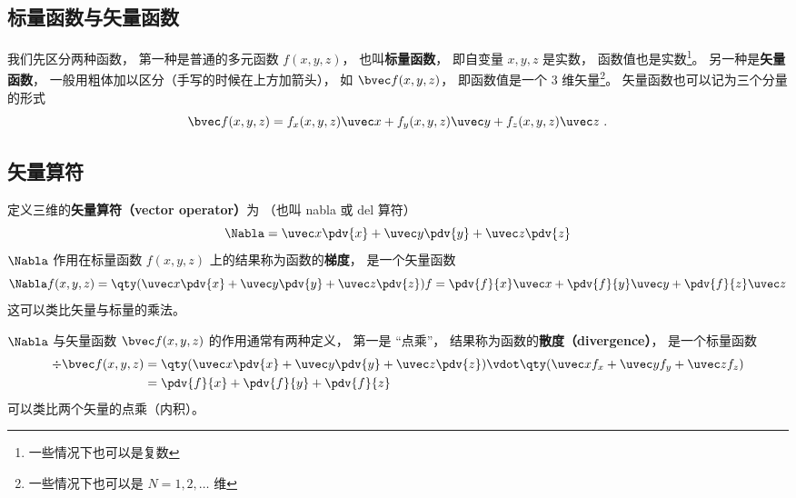 

\subsection{标量函数与矢量函数}
我们先区分两种函数， 第一种是普通的多元函数 $f(x, y, z)$， 也叫\textbf{标量函数}， 即自变量 $x, y, z$ 是实数， 函数值也是实数\footnote{一些情况下也可以是复数}。 另一种是\textbf{矢量函数}， 一般用粗体加以区分（手写的时候在上方加箭头）， 如 $\bvec f(x, y, z)$， 即函数值是一个 3 维矢量\footnote{一些情况下也可以是 $N = 1, 2, \dots$ 维}。 矢量函数也可以记为三个分量的形式
\begin{equation}
\bvec f(x, y, z) = f_x(x, y, z) \uvec x + f_y(x, y, z) \uvec y + f_z(x, y, z) \uvec z~.
\end{equation}

\subsection{矢量算符}
定义三维的\textbf{矢量算符（vector operator）}为 （也叫 nabla 或 del 算符）
\begin{equation}
\Nabla = \uvec x \pdv{x} + \uvec y \pdv{y} + \uvec z \pdv{z}
\end{equation}
$\Nabla$ 作用在标量函数 $f(x, y, z)$ 上的结果称为函数的\textbf{梯度}， 是一个矢量函数
\begin{equation}\label{eq_VecOp_2}
\Nabla f(x, y, z) = \qty(\uvec x \pdv{x} + \uvec y \pdv{y} + \uvec z \pdv{z}) f = \pdv{f}{x} \uvec x + \pdv{f}{y} \uvec y + \pdv{f}{z} \uvec z
\end{equation}
这可以类比矢量与标量的乘法。

$\Nabla$ 与矢量函数 $\bvec f(x, y, z)$ 的作用通常有两种定义， 第一是 “点乘”， 结果称为函数的\textbf{散度（divergence）}， 是一个标量函数
\begin{equation}\label{eq_VecOp_1}
\begin{aligned}
\div \bvec f(x, y, z) &= \qty(\uvec x \pdv{x} + \uvec y \pdv{y} + \uvec z \pdv{z}) \vdot \qty(\uvec x f_x + \uvec y f_y + \uvec z f_z)\\
&= \pdv{f}{x} + \pdv{f}{y} + \pdv{f}{z}
\end{aligned}
\end{equation}
可以类比两个矢量的点乘（内积）。

